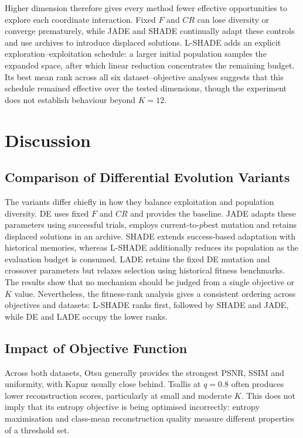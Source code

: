 \documentclass[review,authoryear]{elsarticle}
\begin{document}
Higher dimension therefore gives every method fewer effective opportunities
to explore each coordinate interaction. Fixed $F$ and $CR$ can lose diversity
or converge prematurely, while JADE and SHADE continually adapt these controls
and use archives to introduce displaced solutions. L-SHADE adds an explicit
exploration--exploitation schedule: a larger initial population samples the
expanded space, after which linear reduction concentrates the remaining
budget. Its best mean rank across all six dataset--objective analyses suggests
that this schedule remained effective over the tested dimensions, though the
experiment does not establish behaviour beyond $K=12$.





\section{Discussion}
\label{sec:discussion}



\subsection{Comparison of Differential Evolution Variants}

The variants differ chiefly in how they balance exploitation and
population diversity. DE uses fixed $F$ and $CR$ and provides the
baseline. JADE adapts these parameters using successful trials, employs
current-to-$p$best mutation and retains displaced solutions in an
archive. SHADE extends success-based adaptation with historical memories,
whereas L-SHADE additionally reduces its population as the evaluation
budget is consumed. LADE retains the fixed DE mutation and crossover
parameters but relaxes selection using historical fitness benchmarks.
The results show that no mechanism should be judged from a single
objective or $K$ value. Nevertheless, the fitness-rank analysis gives a
consistent ordering across objectives and datasets: L-SHADE ranks first,
followed by SHADE and JADE, while DE and LADE occupy the lower ranks.


\subsection{Impact of Objective Function}

Across both datasets, Otsu generally provides the strongest PSNR, SSIM
and uniformity, with Kapur usually close behind. Tsallis at $q=0.8$
often produces lower reconstruction scores, particularly at small and
moderate $K$. This does not imply that its entropy objective is being
optimised incorrectly: entropy maximisation and class-mean reconstruction
quality measure different properties of a threshold set.
\end{document}
